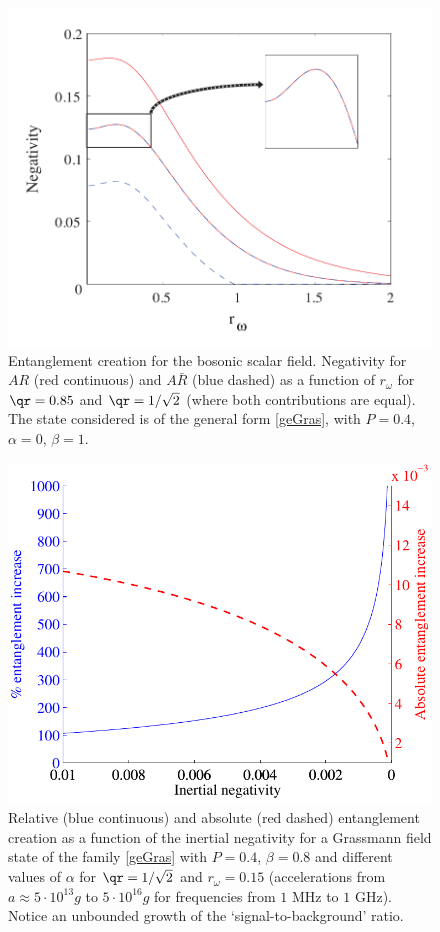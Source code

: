   \begin{figure}[h] 
  \begin{center}
\includegraphics[width=.85\textwidth]{figcdv5bos}
\end{center}
\caption{Entanglement creation for the bosonic scalar field. Negativity for $AR$ (red continuous) and $A\bar R$ (blue dashed) as a function of $r_\omega$ for $\qr=0.85$ and $\qr=1/\sqrt{2}$ (where both contributions are equal). The state considered is of the general form \eqref{geGras}, with $P=0.4$, $\alpha=0$, $\beta=1$.}
\label{ent2}
\end{figure}
\begin{figure}[h]
\begin{center} 
\includegraphics[width=.85\textwidth]{diverg}
\end{center}
\caption{Relative (blue continuous) and absolute (red dashed) entanglement creation  as a function of the inertial negativity for a Grassmann field  state of the family \eqref{geGras} with $P=0.4$, $\beta=0.8$ and different values of $\alpha$ for $\qr=1/\sqrt{2}$ and  $r_\omega=0.15$ (accelerations from $a\approx 5\cdot10^{13}g $ to $5\cdot10^{16} g$ for frequencies from $1 \text{ MHz}$ to $1 \text{ GHz}$). Notice an unbounded growth of the `signal-to-background' ratio.}
\label{unbo}
\end{figure}

